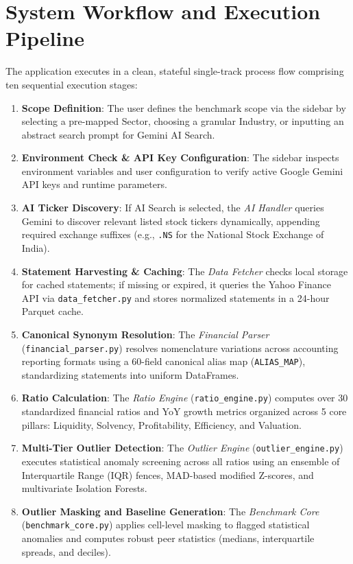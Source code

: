 \section{System Workflow and Execution Pipeline}
The application executes in a clean, stateful single-track process flow comprising ten sequential execution stages:

\begin{enumerate}
    \item \textbf{Scope Definition}: The user defines the benchmark scope via the sidebar by selecting a pre-mapped Sector, choosing a granular Industry, or inputting an abstract search prompt for Gemini AI Search.
    \item \textbf{Environment Check \& API Key Configuration}: The sidebar inspects environment variables and user configuration to verify active Google Gemini API keys and runtime parameters.
    \item \textbf{AI Ticker Discovery}: If AI Search is selected, the \textit{AI Handler} queries Gemini to discover relevant listed stock tickers dynamically, appending required exchange suffixes (e.g., \texttt{.NS} for the National Stock Exchange of India).
    \item \textbf{Statement Harvesting \& Caching}: The \textit{Data Fetcher} checks local storage for cached statements; if missing or expired, it queries the Yahoo Finance API via \texttt{data\_fetcher.py} and stores normalized statements in a 24-hour Parquet cache.
    \item \textbf{Canonical Synonym Resolution}: The \textit{Financial Parser} (\texttt{financial\_parser.py}) resolves nomenclature variations across accounting reporting formats using a 60-field canonical alias map (\texttt{ALIAS\_MAP}), standardizing statements into uniform DataFrames.
    \item \textbf{Ratio Calculation}: The \textit{Ratio Engine} (\texttt{ratio\_engine.py}) computes over 30 standardized financial ratios and YoY growth metrics organized across 5 core pillars: Liquidity, Solvency, Profitability, Efficiency, and Valuation.
    \item \textbf{Multi-Tier Outlier Detection}: The \textit{Outlier Engine} (\texttt{outlier\_engine.py}) executes statistical anomaly screening across all ratios using an ensemble of Interquartile Range (IQR) fences, MAD-based modified Z-scores, and multivariate Isolation Forests.
    \item \textbf{Outlier Masking and Baseline Generation}: The \textit{Benchmark Core} (\texttt{benchmark\_}\allowbreak\texttt{core.py}) applies cell-level masking to flagged statistical anomalies and computes robust peer statistics (medians, interquartile spreads, and deciles).

\end{enumerate}
